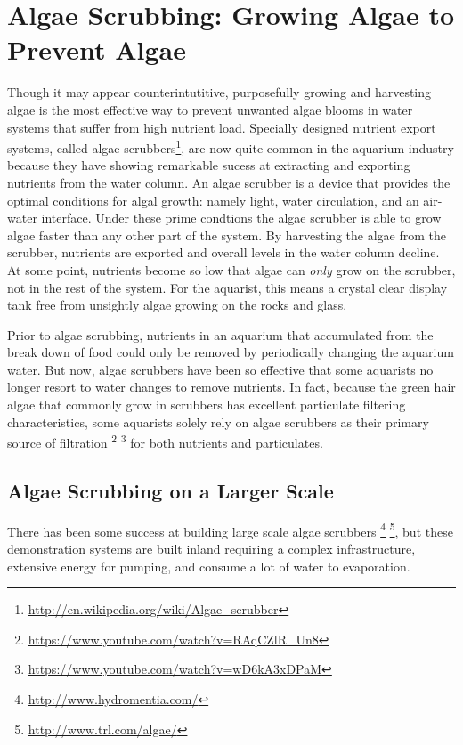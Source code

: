 \documentclass{article}
\begin{document}

\section{Algae Scrubbing: Growing Algae to Prevent Algae}

Though it may appear counterintutitive,
purposefully growing and harvesting algae is the
most effective way to prevent unwanted algae blooms
in water systems that suffer from high nutrient load.
Specially designed nutrient export systems,
called algae scrubbers\footnote{\url{http://en.wikipedia.org/wiki/Algae_scrubber}},
are now quite common 
in the aquarium industry because they have showing remarkable sucess
at extracting and exporting nutrients from the water column.
An algae scrubber is a device that provides the 
optimal conditions for algal growth: namely light,
water circulation, and an air-water interface.
Under these prime condtions the algae scrubber is able to
grow algae faster than any other part of the system.
By harvesting the algae from the scrubber, nutrients 
are exported and overall levels in the water column decline.
At some point, nutrients become so low that algae can \textit{only}
grow on the scrubber, not in the rest of the system.
For the aquarist, this means a crystal clear display tank
free from unsightly algae growing on the rocks and glass.

Prior to algae scrubbing, nutrients in an aquarium
that accumulated from the break down of food
could only be removed by periodically changing the aquarium water.
But now, algae scrubbers have been so effective that
some aquarists no longer resort to water changes to remove nutrients.
In fact, because the green hair algae that
commonly grow in scrubbers has excellent particulate filtering characteristics,
some aquarists solely rely on algae scrubbers as their primary source of filtration%
\footnote{\url{https://www.youtube.com/watch?v=RAqCZlR\_Un8}}%
\footnote{\url{https://www.youtube.com/watch?v=wD6kA3xDPaM}}
for both nutrients and particulates.

\subsection{Algae Scrubbing on a Larger Scale}

There has been some success at building large scale algae scrubbers%
\footnote{\url{http://www.hydromentia.com/}}%
\footnote{\url{http://www.trl.com/algae/}},
but these demonstration systems are built inland requiring
a complex infrastructure, extensive energy for pumping,
and consume a lot of water to evaporation.
\end{document}
